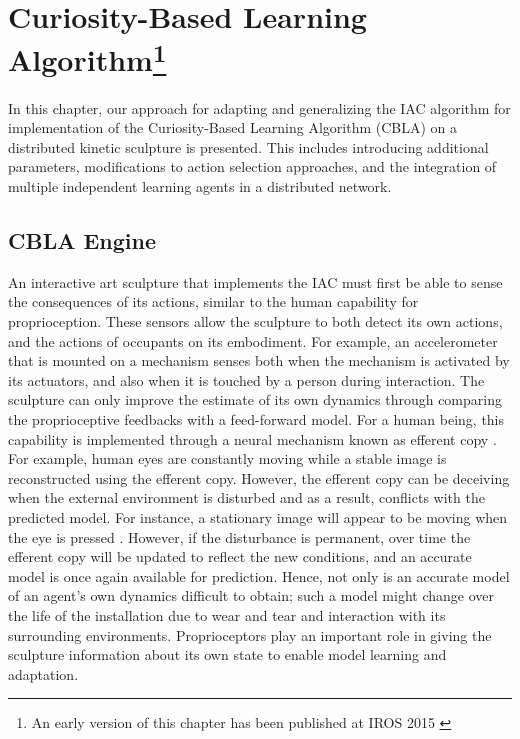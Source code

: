 \chapter[Curiosity-Based Learning Algorithm]
{Curiosity-Based Learning Algorithm\footnote{An early version of this chapter has been published at IROS 2015 \cite{Chan2015} }} 
\label{chap:cbla}

In this chapter, our approach for adapting and generalizing the IAC algorithm \cite{Oudeyer2007} for implementation of the Curiosity-Based Learning Algorithm (CBLA) on a distributed kinetic sculpture is presented. This includes introducing additional parameters, modifications to action selection approaches, and the integration of multiple independent learning agents in a distributed network. 


\section{CBLA Engine}

An interactive art sculpture that implements the IAC must first be able to sense the consequences of its actions, similar to the human capability for proprioception. These sensors allow the sculpture to both detect its own actions, and the actions of occupants on its embodiment. For example, an accelerometer that is mounted on a mechanism senses both when the mechanism is activated by its actuators, and also when it is touched by a person during interaction. The sculpture can only improve the estimate of its own dynamics through comparing the proprioceptive feedbacks with a feed-forward model. For a human being, this capability is implemented through a neural mechanism known as efferent copy \cite{Bridgeman2007}. For example, human eyes are constantly moving while a stable image is reconstructed using the efferent copy. However, the efferent copy can be deceiving when the external environment is disturbed and as a result, conflicts with the predicted model. For instance, a stationary image will appear to be moving when the eye is pressed \cite{Bridgeman2007}. However, if the disturbance is permanent, over time the efferent copy will be updated to reflect the new conditions, and an accurate model is once again available for prediction. Hence, not only is an accurate model of an agent's own dynamics difficult to obtain; such a model might change over the life of the installation due to wear and tear and interaction with its surrounding environments. Proprioceptors play an important role in giving the sculpture information about its own state to enable model learning and adaptation.


